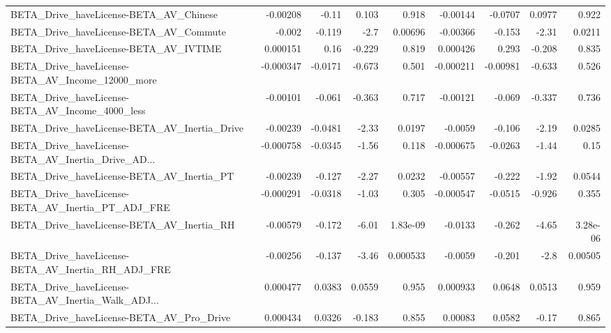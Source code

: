 \begin{tabular}{lrrrrrrrr}
BETA\_Drive\_haveLicense-BETA\_AV\_Chinese             &    -0.00208 &        -0.11 &    0.103 &    0.918 &   -0.00144 &     -0.0707 &       0.0977 &         0.922 \\
BETA\_Drive\_haveLicense-BETA\_AV\_Commute             &      -0.002 &       -0.119 &     -2.7 &  0.00696 &   -0.00366 &      -0.153 &        -2.31 &        0.0211 \\
BETA\_Drive\_haveLicense-BETA\_AV\_IVTIME              &    0.000151 &         0.16 &   -0.229 &    0.819 &   0.000426 &       0.293 &       -0.208 &         0.835 \\
BETA\_Drive\_haveLicense-BETA\_AV\_Income\_12000\_more   &   -0.000347 &      -0.0171 &   -0.673 &    0.501 &  -0.000211 &    -0.00981 &       -0.633 &         0.526 \\
BETA\_Drive\_haveLicense-BETA\_AV\_Income\_4000\_less    &    -0.00101 &       -0.061 &   -0.363 &    0.717 &   -0.00121 &      -0.069 &       -0.337 &         0.736 \\
BETA\_Drive\_haveLicense-BETA\_AV\_Inertia\_Drive       &    -0.00239 &      -0.0481 &    -2.33 &   0.0197 &    -0.0059 &      -0.106 &        -2.19 &        0.0285 \\
BETA\_Drive\_haveLicense-BETA\_AV\_Inertia\_Drive\_AD... &   -0.000758 &      -0.0345 &    -1.56 &    0.118 &  -0.000675 &     -0.0263 &        -1.44 &          0.15 \\
BETA\_Drive\_haveLicense-BETA\_AV\_Inertia\_PT          &    -0.00239 &       -0.127 &    -2.27 &   0.0232 &   -0.00557 &      -0.222 &        -1.92 &        0.0544 \\
BETA\_Drive\_haveLicense-BETA\_AV\_Inertia\_PT\_ADJ\_FRE  &   -0.000291 &      -0.0318 &    -1.03 &    0.305 &  -0.000547 &     -0.0515 &       -0.926 &         0.355 \\
BETA\_Drive\_haveLicense-BETA\_AV\_Inertia\_RH          &    -0.00579 &       -0.172 &    -6.01 & 1.83e-09 &    -0.0133 &      -0.262 &        -4.65 &      3.28e-06 \\
BETA\_Drive\_haveLicense-BETA\_AV\_Inertia\_RH\_ADJ\_FRE  &    -0.00256 &       -0.137 &    -3.46 & 0.000533 &    -0.0059 &      -0.201 &         -2.8 &       0.00505 \\
BETA\_Drive\_haveLicense-BETA\_AV\_Inertia\_Walk\_ADJ... &    0.000477 &       0.0383 &   0.0559 &    0.955 &   0.000933 &      0.0648 &       0.0513 &         0.959 \\
BETA\_Drive\_haveLicense-BETA\_AV\_Pro\_Drive           &    0.000434 &       0.0326 &   -0.183 &    0.855 &    0.00083 &      0.0582 &        -0.17 &         0.865 \\

\end{tabular}
